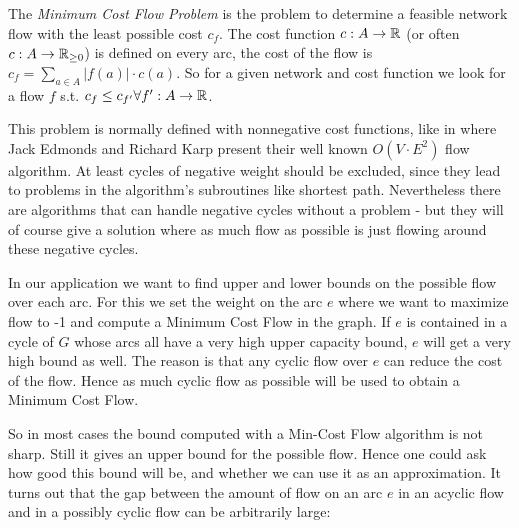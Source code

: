 \begin{definition}
 The \textit{Minimum Cost Flow Problem} is the problem to determine a feasible network flow with the least possible 
cost $c_f$. The cost function $c:A\to \mathbb{R}$ (or often $c:A\to \mathbb{R}_{\ge 0}$) is defined on every arc, the cost of the flow 
is $c_f = \sum_{a\in A}|f(a)|\cdot c(a)$. So for a given network and cost function we look for a flow $f$ s.t. $c_f\le 
c_{f'}\forall f':A\to \mathbb{R}$.
\end{definition}

This problem is normally defined with nonnegative cost functions, like in \cite{EdmondsKarp1972} where 
Jack Edmonds and Richard Karp present their well known $O(V\cdot E^2)$ flow algorithm. At least cycles of negative 
weight should be excluded, since they lead to problems in the algorithm's subroutines like shortest path. Nevertheless 
there are algorithms that can handle negative cycles without a problem - but they will of course give a solution 
where as much flow as possible is just flowing around these negative cycles. 

In our application we want to find upper and lower bounds on the possible flow over each arc. For this we set the 
weight on the arc $e$ where we want to maximize flow to -1 and compute a Minimum Cost Flow in the graph. If $e$ is 
contained in a cycle of $G$ whose arcs all have a very high upper capacity bound, $e$ will get a very high bound as 
well. The reason is that any cyclic flow over $e$ can reduce the cost of the flow. Hence as much cyclic flow as 
possible will be used to obtain a Minimum Cost Flow. 

So in most cases the bound computed with a Min-Cost Flow algorithm is not sharp. Still it gives an upper bound for the 
possible flow. Hence one could ask how good this bound will be, and whether we can use it as an approximation. It turns 
out that the gap between the amount of flow on an arc $e$ in an acyclic flow and in a possibly cyclic flow can be 
arbitrarily large:

